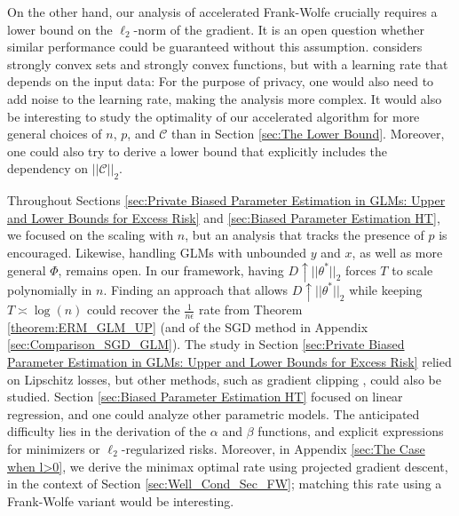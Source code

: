 \documentclass{article}
\begin{document}
On the other hand, our analysis of accelerated Frank-Wolfe crucially requires a lower bound on the $\ell_2$-norm of the gradient. It is an open question whether similar performance could be guaranteed without this assumption. \cite{ACCFW} considers strongly convex sets and strongly convex functions, but with a learning rate that depends on the input data: For the purpose of privacy, one would also need to add noise to the learning rate, making the analysis more complex. It would also be interesting to study the optimality of our accelerated algorithm for more general choices of $n$, $p$, and $\mathcal{C}$ than in Section \ref{sec:The Lower Bound}. Moreover, one could also try to derive a lower bound that explicitly includes the dependency on $||\mathcal{C}||_2$. 

Throughout Sections \ref{sec:Private Biased Parameter Estimation in GLMs: Upper and Lower Bounds for Excess Risk} and \ref{sec:Biased Parameter Estimation HT}, we focused on the scaling with $n$, but an analysis that tracks the presence of $p$ is encouraged. Likewise, handling GLMs with unbounded $y$ and $x$, as well as more general $\Phi$, remains open. In our framework, having $D \uparrow ||\theta^*||_2$ forces $T$ to scale polynomially in $n$. Finding an approach that allows $D \uparrow ||\theta^*||_2$ while keeping $T \asymp \log(n)$ could recover the $\frac{1}{n\epsilon}$ rate from Theorem \ref{theorem:ERM_GLM_UP} (and of the SGD method in Appendix \ref{sec:Comparison_SGD_GLM}). The study in Section  \ref{sec:Private Biased Parameter Estimation in GLMs: Upper and Lower Bounds for Excess Risk} relied on Lipschitz losses, but other methods, such as gradient clipping \cite{Deep_Learn_DP_Clip}, could also be studied. Section \ref{sec:Biased Parameter Estimation HT} focused on linear regression, and one could analyze other parametric models. The anticipated difficulty lies in the derivation of the $\alpha$ and $\beta$ functions, and explicit expressions for minimizers or $\ell_2$-regularized risks. Moreover, in Appendix \ref{sec:The Case when l>0}, we derive the minimax optimal rate using projected gradient descent, in the context of Section \ref{sec:Well_Cond_Sec_FW}; matching this rate using a Frank-Wolfe variant would be interesting.
\end{document}
